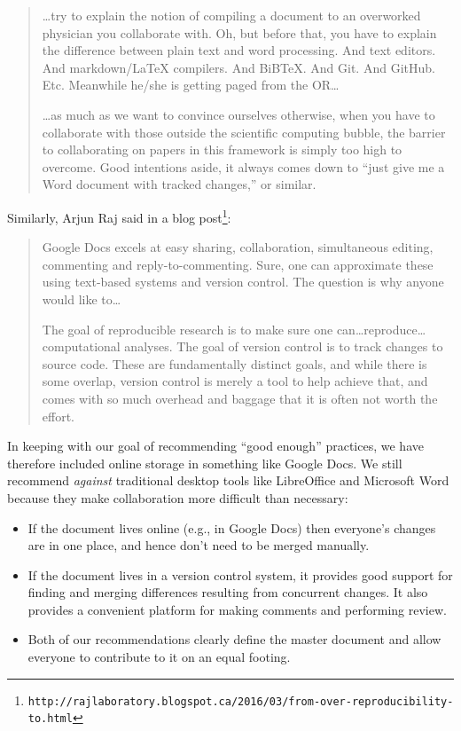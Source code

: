 \documentclass[10pt]{article}
\newcommand{\withurl}[2]{{#1}\footnote{\texttt{#2}}}
\begin{document}
\begin{quote}
{\ldots}try to explain the notion of compiling a document to an
overworked physician you collaborate with. Oh, but before that, you
have to explain the difference between plain text and word
processing. And text editors. And markdown/LaTeX compilers. And
BiBTeX. And Git. And GitHub. Etc. Meanwhile he/she is getting paged
from the OR{\ldots}

{\ldots}as much as we want to convince ourselves otherwise, when you
have to collaborate with those outside the scientific computing
bubble, the barrier to collaborating on papers in this framework is
simply too high to overcome. Good intentions aside, it always comes
down to ``just give me a Word document with tracked changes,'' or
similar.
\end{quote}

Similarly, Arjun Raj said in \withurl{a blog
  post}{http://rajlaboratory.blogspot.ca/2016/03/from-over-reproducibility-to.html}:

\begin{quote}
Google Docs excels at easy sharing, collaboration, simultaneous
editing, commenting and reply-to-commenting. Sure, one can approximate
these using text-based systems and version control. The question is
why anyone would like to{\ldots}

The goal of reproducible research is to make sure one
can{\dots}reproduce{\ldots}computational analyses. The goal of version
control is to track changes to source code. These are fundamentally
distinct goals, and while there is some overlap, version control is
merely a tool to help achieve that, and comes with so much overhead
and baggage that it is often not worth the effort.
\end{quote}

In keeping with our goal of recommending ``good enough'' practices, we
have therefore included online storage in something like Google
Docs. We still recommend \emph{against} traditional desktop tools like
LibreOffice and Microsoft Word because they make collaboration more
difficult than necessary:

\begin{itemize}

\item
  If the document lives online (e.g., in Google Docs) then everyone's
  changes are in one place, and hence don't need to be merged
  manually.

\item
  If the document lives in a version control system, it provides good
  support for finding and merging differences resulting from
  concurrent changes. It also provides a convenient platform for
  making comments and performing review.

\item
  Both of our recommendations clearly define the master document and
  allow everyone to contribute to it on an equal footing.

\end{itemize}
\end{document}

